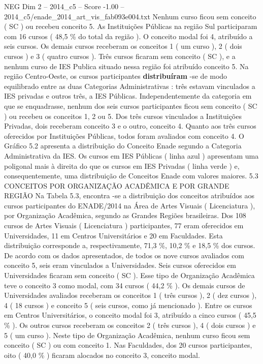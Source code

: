 \begin{textsample}{NEG Dim 2 – 2014\_c5 – Score -1.00 – 2014\_c5/enade\_2014\_art\_vis\_fab093e004.txt}
Nenhum curso ficou sem conceito ( SC ) ou recebeu conceito 5.
As Instituições Públicas na região Sul participaram com 16 cursos ( 48,5 \% do total da região ).
O conceito modal foi 4, atribuído a seis cursos.
Os demais cursos receberam os conceitos 1 ( um curso ), 2 ( dois cursos ) e 3 ( quatro cursos ).
Três cursos ficaram sem conceito ( SC ), e a nenhum curso de IES Publica situado nessa região foi atribuído conceito 5.
Na região Centro-Oeste, os cursos participantes \textbf{distribuíram} -se de modo equilibrado entre as duas Categorias Administrativas : três estavam vinculados a IES privadas e outros três, a IES Públicas.
Independentemente da categoria em que se enquadrasse, nenhum dos seis cursos participantes ficou sem conceito ( SC ) ou recebeu os conceitos 1, 2 ou 5.
Dos três cursos vinculados a Instituições Privadas, dois receberam conceito 3 e o outro, conceito 4.
Quanto aos três cursos oferecidos por Instituições Públicas, todos foram avaliados com conceito 4.
O Gráfico 5.2 apresenta a distribuição do Conceito Enade segundo a Categoria Administrativa da IES.
Os cursos em IES Públicas ( linha azul ) apresentam uma poligonal mais à direita do que os cursos em IES Privadas ( linha verde ) e, consequentemente, uma distribuição de Conceitos Enade com valores maiores. 5.3 CONCEITOS POR ORGANIZAÇÃO ACADÊMICA E POR GRANDE REGIÃO Na Tabela 5.3, encontra -se a distribuição dos conceitos atribuídos aos cursos participantes do ENADE/2014 na Área de Artes Visuais ( Licenciatura ), por Organização Acadêmica, segundo as Grandes Regiões brasileiras.
Dos 108 cursos de Artes Visuais ( Licenciatura ) participantes, 77 eram oferecidos em Universidades, 11 em Centros Universitários e 20 em Faculdades.
Esta distribuição corresponde a, respectivamente, 71,3 \%, 10,2 \% e 18,5 \% dos cursos.
De acordo com os dados apresentados, de todos os nove cursos avaliados com conceito 5, seis eram vinculados a Universidades.
Seis cursos oferecidos em Universidades ficaram sem conceito ( SC ).
Esse tipo de Organização Acadêmica teve o conceito 3 como modal, com 34 cursos ( 44,2 \% ).
Os demais cursos de Universidades avaliados receberam os conceitos 1 ( três cursos ), 2 ( dez cursos ), 4 ( 18 cursos ) e conceito 5 ( seis cursos, como já mencionado ).
Entre os cursos em Centros Universitários, o conceito modal foi 3, atribuído a cinco cursos ( 45,5 \% ).
Os outros cursos receberam os conceitos 2 ( três cursos ), 4 ( dois cursos ) e 5 ( um curso ).
Neste tipo de Organização Acadêmica, nenhum curso ficou sem conceito ( SC ) ou com conceito 1.
Nas Faculdades, dos 20 cursos participantes, oito ( 40,0 \% ) ficaram alocados no conceito 3, conceito modal.

\end{textsample}
